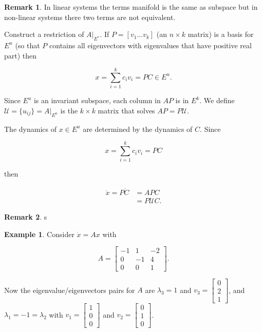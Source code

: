 \documentclass[12pt]{article}
\newcommand{\U}{\mathcal{U}}
\theoremstyle{definition}
\newtheorem*{example}{Example}
\newtheorem*{remark}{Remark}
\begin{document}
\begin{remark}
In linear systems the terms manifold is the same as subspace but in non-linear systems there two terms are not
equivalent.
\end{remark}


Construct a restriction of $A \big|_{E^{s}}$. If $P = [v_1 \ldots v_k]$ (an $n \times k$ matrix) is a basis
for $E^u$ (so that $P$ contains all eigenvectors with eigenvalues that have positive real part) then

\[
x = \sum^{k}_{i=1} c_i v_i = PC \in E^u.
\]

Since $E^u$ is an invariant subspace, each column in $AP$ is in $E^k$. We define 
$\U = \{ u_{ij} \} = A \big|_{E^{u}}$ is the $k \times k$ matrix that solves
$AP = P\U$.

The dynamics of $x \in E^u$ are determined by the dynamics of $C$. Since

\[
x = \sum^{k}_{i=1} c_i v_i = PC
\]

then 

\[
\begin{split}
\dot x = P \dot C &= APC \\
&= P \U C.
\end{split}
\]

\begin{remark}
s
\end{remark}


\begin{example}
Consider $\dot x = Ax$ with

\[
A =
\begin{bmatrix}
-1 & 1 & -2 \\
0 & -1 & 4 \\
0 & 0 & 1 
\end{bmatrix}.
\]

Now the eigenvalue/eigenvectors pairs for $A$ are $\lambda_3 = 1$ and 
$v_3 = \begin{bmatrix} 0 \\ 2 \\ 1 \end{bmatrix}$, and $\lambda_1 = -1 = \lambda_2$ with
$v_1 = \begin{bmatrix} 1 \\ 0 \\ 0 \end{bmatrix}$ and
$v_2 = \begin{bmatrix} 0 \\ 1 \\ 0 \end{bmatrix}$. 



\end{example}
\end{document}
